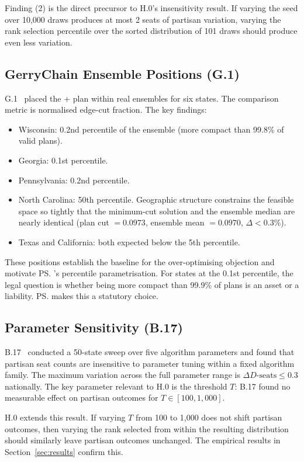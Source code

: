 Finding (2) is the direct precursor to H.0's insensitivity result.
If varying the seed over 10,000 draws produces at most 2 seats of partisan
variation, varying the rank selection percentile over the sorted distribution
of 101 draws should produce even less variation.

\subsection{GerryChain Ensemble Positions (G.1)}

G.1~\citep{g1paper} placed the \ar{} + \cs{} plan within real \gc{} \recom{}
ensembles for six states.
The comparison metric is normalised edge-cut fraction.
The key findings:
\begin{itemize}
\item Wisconsin: 0.2nd percentile of the ensemble (more compact than 99.8\%
      of valid plans).
\item Georgia: 0.1st percentile.
\item Pennsylvania: 0.2nd percentile.
\item North Carolina: 50th percentile.
      Geographic structure constrains the feasible space so tightly that
      the minimum-cut solution and the ensemble median are nearly identical
      (plan cut $= 0.0973$, ensemble mean $= 0.0970$, $\Delta < 0.3\%$).
\item Texas and California: both expected below the 5th percentile.
\end{itemize}

These positions establish the baseline for the over-optimising objection and
motivate \ps{}'s percentile parametrisation.
For states at the 0.1st percentile, the legal question is whether being more
compact than 99.9\% of plans is an asset or a liability.
\ps{} makes this a statutory choice.

\subsection{Parameter Sensitivity (B.17)}

B.17~\citep{b17paper} conducted a 50-state sweep over five algorithm
parameters and found that partisan seat counts are insensitive to parameter
tuning within a fixed algorithm family.
The maximum variation across the full parameter range is $\Delta
D\text{-seats} \leq 0.3$ nationally.
The key parameter relevant to H.0 is the \cs{} threshold $T$: B.17 found
no measurable effect on partisan outcomes for $T \in [100, 1{,}000]$.

H.0 extends this result.
If varying $T$ from 100 to 1,000 does not shift partisan outcomes, then
varying the rank selected from within the resulting distribution should
similarly leave partisan outcomes unchanged.
The empirical results in Section~\ref{sec:results} confirm this.
